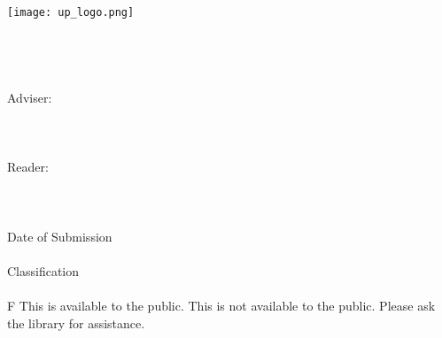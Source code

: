 \begin{titlepage}
\center
\vspace*{0.55cm}

\texttt{[image: up\_logo.png]}\\[0.6cm]

\MakeUppercase{\university}\\[1cm]

\degree\\[1.2cm]

\textbf{\student}\\
\bigskip
\mstitle\\[1.2cm]

\mstype{} Adviser:\\
\bigskip
\textbf{\adviser}\\
\department\\
\university{} \campus\\[1.2cm]

\mstype{} Reader:\\
\bigskip
\textbf{\reader}\\
\department\\
\university{} \campus\\[1.2cm]

Date of Submission\\
\medskip
\submissiondate\\[1.2cm]

\mstype{} Classification\\
\medskip
\textbf{\msclass}\\
\medskip
\if \msclass F
This \MakeLowercase{\mstype} is available to the public.
\else
This \MakeLowercase{\mstype} is not available to the public. Please ask the library for assistance.
\fi

\end{titlepage}

